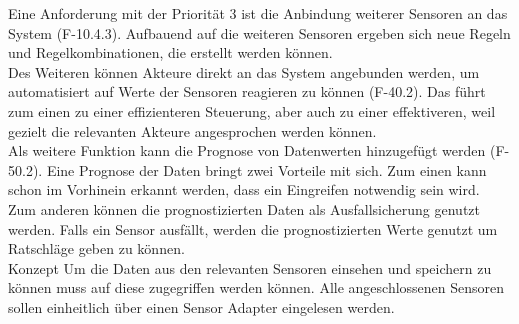 Eine Anforderung mit der Priorität 3 ist die Anbindung weiterer Sensoren an das System (F-10.4.3). Aufbauend auf die weiteren Sensoren ergeben sich neue Regeln und Regelkombinationen, die erstellt werden können.\\
Des Weiteren können Akteure direkt an das System angebunden werden, um automatisiert auf Werte der Sensoren reagieren zu können (F-40.2). Das führt zum einen zu einer effizienteren Steuerung, aber auch zu einer effektiveren, weil gezielt die relevanten Akteure angesprochen werden können.\\
Als weitere Funktion kann die Prognose von Datenwerten hinzugefügt werden (F-50.2). Eine Prognose der Daten bringt zwei Vorteile mit sich. Zum einen kann schon im Vorhinein erkannt werden, dass ein Eingreifen notwendig sein wird. Zum anderen können die prognostizierten Daten als Ausfallsicherung genutzt werden. Falls ein Sensor ausfällt, werden die prognostizierten Werte genutzt um Ratschläge geben zu können.\\
Konzept
Um die Daten aus den relevanten Sensoren einsehen und speichern zu können muss auf diese zugegriffen werden können. Alle angeschlossenen Sensoren sollen einheitlich über einen Sensor Adapter eingelesen werden.

